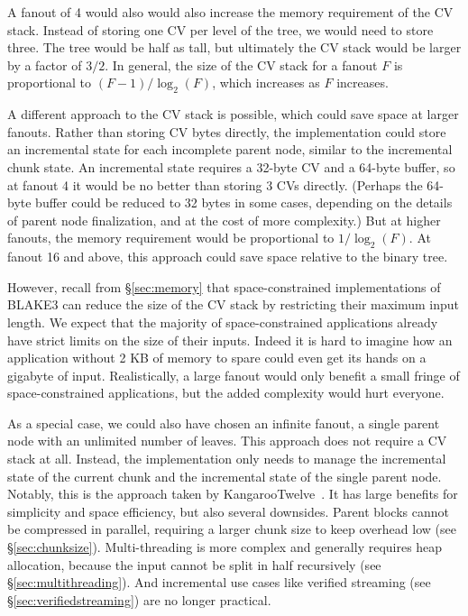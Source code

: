 \documentclass[11pt,notitlepage,a4paper]{article}
\begin{document}
A fanout of 4 would also would also increase the memory requirement of the CV
stack. Instead of storing one CV per level of the tree, we would need to store
three. The tree would be half as tall, but ultimately the CV stack would be
larger by a factor of $3/2$. In general, the size of the CV stack for a fanout
$F$ is proportional to $(F-1)/\log_2(F)$, which increases as $F$ increases.

A different approach to the CV stack is possible, which could save space at
larger fanouts. Rather than storing CV bytes directly, the implementation could
store an incremental state for each incomplete parent node, similar to the
incremental chunk state. An incremental state requires a 32-byte CV and a
64-byte buffer, so at fanout 4 it would be no better than storing 3 CVs
directly. (Perhaps the 64-byte buffer could be reduced to 32 bytes in some
cases, depending on the details of parent node finalization, and at the cost of
more complexity.) But at higher fanouts, the memory requirement would be
proportional to $1/\log_2(F)$. At fanout 16 and above, this approach could save
space relative to the binary tree.

However, recall from \S\ref{sec:memory} that space-constrained implementations
of BLAKE3 can reduce the size of the CV stack by restricting their maximum
input length. We expect that the majority of space-constrained applications
already have strict limits on the size of their inputs. Indeed it is hard to
imagine how an application without 2 KB of memory to spare could even get its
hands on a gigabyte of input. Realistically, a large fanout would only benefit
a small fringe of space-constrained applications, but the added complexity
would hurt everyone.

As a special case, we could also have chosen an infinite fanout, a single
parent node with an unlimited number of leaves. This approach does not require
a CV stack at all. Instead, the implementation only needs to manage the
incremental state of the current chunk and the incremental state of the single
parent node. Notably, this is the approach taken by
KangarooTwelve~\cite{DBLP:conf/acns/BertoniDPAKV18}. It has large benefits for
simplicity and space efficiency, but also several downsides. Parent blocks
cannot be compressed in parallel, requiring a larger chunk size to keep
overhead low (see \S\ref{sec:chunksize}). Multi-threading is more complex and
generally requires heap allocation, because the input cannot be split in half
recursively (see \S\ref{sec:multithreading}). And incremental use cases like
verified streaming (see \S\ref{sec:verifiedstreaming}) are no longer practical.
\end{document}

